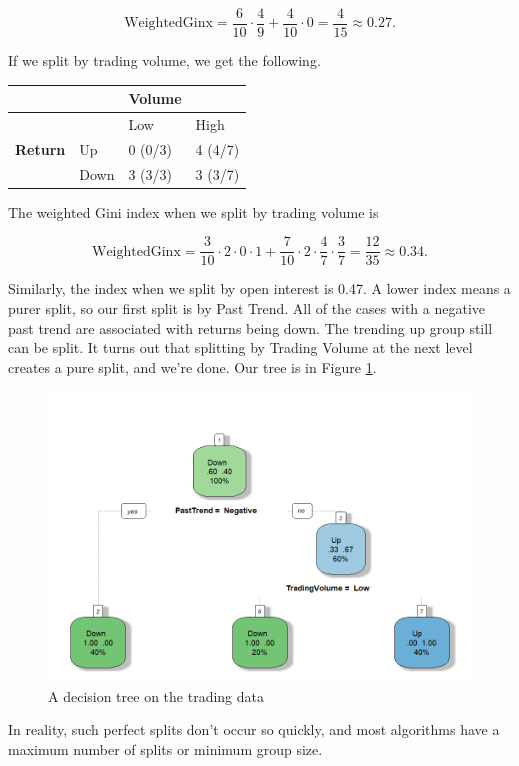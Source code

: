 \documentclass[
]{book}
\theoremstyle{definition}
\theoremstyle{definition}
\theoremstyle{definition}
\theoremstyle{definition}
\theoremstyle{remark}
\begin{document}
\[\text{WeightedGinx}=\frac{6}{10}\cdot\frac{4}{9}+\frac{4}{10}\cdot0=\frac{4}{15}\approx 0.27.\]

If we split by trading volume, we get the following.

\begin{longtable}[]{@{}llll@{}}
\toprule\noalign{}
& & \textbf{Volume} & \\
\midrule\noalign{}
\endhead
\bottomrule\noalign{}
\endlastfoot
& & Low & High \\
\textbf{Return} & Up & 0 (0/3) & 4 (4/7) \\
& Down & 3 (3/3) & 3 (3/7) \\
\end{longtable}

The weighted Gini index when we split by trading volume is

\[\text{WeightedGinx}=\frac{3}{10}\cdot 2\cdot 0\cdot 1+\frac{7}{10}\cdot 2\cdot \frac{4}{7}\cdot\frac{3}{7}=\frac{12}{35}\approx 0.34.\]

Similarly, the index when we split by open interest is 0.47. A lower index means a purer split, so our first split is by Past Trend. All of the cases with a negative past trend are associated with returns being down. The trending up group still can be split. It turns out that splitting by Trading Volume at the next level creates a pure split, and we're done. Our tree is in Figure \ref{fig:tree2}.

\begin{figure}

{\centering \includegraphics[width=0.7\linewidth]{images/tree2} 

}

\caption{A decision tree on the trading data}\label{fig:tree2}
\end{figure}

In reality, such perfect splits don't occur so quickly, and most algorithms have a maximum number of splits or minimum group size.
\end{document}
